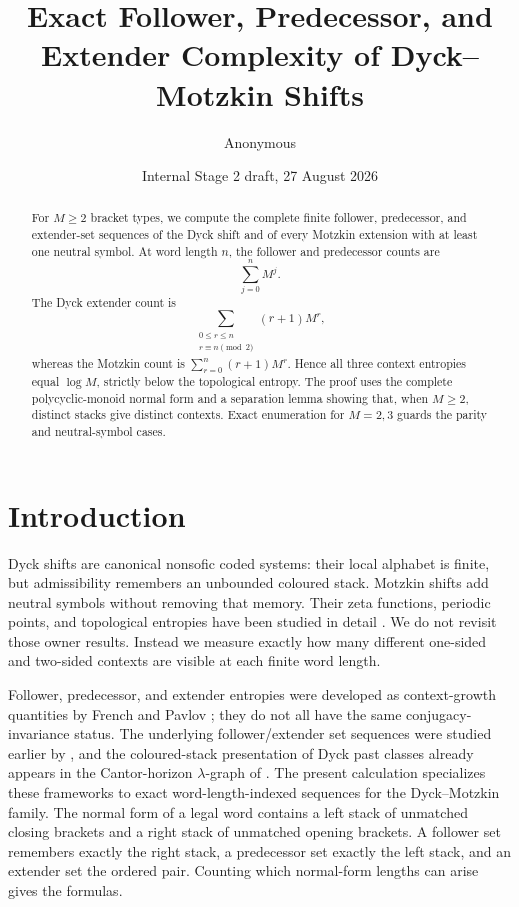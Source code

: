 \documentclass[11pt,a4paper]{amsart}
\title[Context complexity of Dyck--Motzkin shifts]{Exact Follower, Predecessor, and Extender Complexity of Dyck--Motzkin Shifts}
\author{Anonymous}
\date{Internal Stage 2 draft, 27 August 2026}
\theoremstyle{definition}
\theoremstyle{remark}
\begin{document}
\begin{abstract}
For $M\geq2$ bracket types, we compute the complete finite follower,
predecessor, and extender-set sequences of the Dyck shift and of every
Motzkin extension with at least one neutral symbol.  At word length $n$, the
follower and predecessor counts are
\[
 \sum_{j=0}^n M^j.
\]
The Dyck extender count is
\[
 \sum_{\substack{0\leq r\leq n\\r\equiv n\pmod2}}(r+1)M^r,
\]
whereas the Motzkin count is $\sum_{r=0}^n(r+1)M^r$.  Hence all three context
entropies equal $\log M$, strictly below the topological entropy.  The proof
uses the complete polycyclic-monoid normal form and a separation lemma showing
that, when $M\geq2$, distinct stacks give distinct contexts.  Exact
enumeration for $M=2,3$ guards the parity and neutral-symbol cases.
\end{abstract}

\maketitle

\section{Introduction}

Dyck shifts are canonical nonsofic coded systems: their local alphabet is
finite, but admissibility remembers an unbounded coloured stack.  Motzkin
shifts add neutral symbols without removing that memory.  Their zeta
functions, periodic points, and topological entropies have been studied in
detail \cite{Inoue2010,KriegerMatsumoto2011}.  We do not revisit those owner
results.  Instead we measure exactly how many different one-sided and
two-sided contexts are visible at each finite word length.

Follower, predecessor, and extender entropies were developed as
context-growth quantities by French and Pavlov \cite{FrenchPavlov2019}; they
do not all have the same conjugacy-invariance status.  The underlying
follower/extender set sequences were studied earlier by
\citet{French2016}, and the coloured-stack presentation of Dyck past classes
already appears in the Cantor-horizon $\lambda$-graph of
\citet{KriegerMatsumoto2003}.  The present calculation specializes these
frameworks to exact word-length-indexed sequences for the Dyck--Motzkin
family.  The normal form of a legal word contains a left stack of unmatched
closing brackets and a right stack of unmatched opening brackets.  A follower
set remembers exactly the right stack, a predecessor set exactly the left
stack, and an extender set the ordered pair.  Counting which normal-form
lengths can arise gives the formulas.
\end{document}

